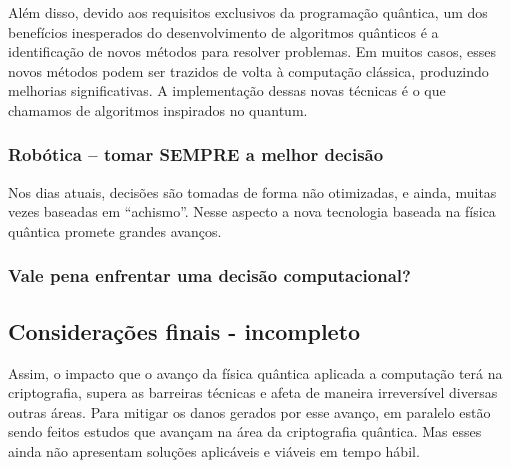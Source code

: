 Além disso, devido aos requisitos exclusivos da programação quântica, um dos benefícios inesperados do desenvolvimento de algoritmos quânticos é a identificação de novos métodos para resolver problemas. Em muitos casos, esses novos métodos podem ser trazidos de volta à computação clássica, produzindo melhorias significativas. A implementação dessas novas técnicas é o que chamamos de algoritmos inspirados no quantum.

\subsubsection{Robótica – tomar SEMPRE a melhor decisão}
Nos dias atuais, decisões são tomadas de forma não otimizadas, e ainda, muitas vezes baseadas em “achismo”. Nesse aspecto a nova tecnologia baseada na física quântica promete grandes avanços. 


\subsubsection{Vale pena enfrentar uma decisão computacional?}

\subsection{Considerações finais - incompleto}
Assim, o impacto que o avanço da física quântica aplicada a computação terá na criptografia, supera as barreiras técnicas e afeta de maneira irreversível diversas outras áreas. Para mitigar os danos gerados por esse avanço, em paralelo estão sendo feitos estudos que avançam na área da criptografia quântica. Mas esses ainda não apresentam soluções aplicáveis e viáveis em tempo hábil.

\newpage